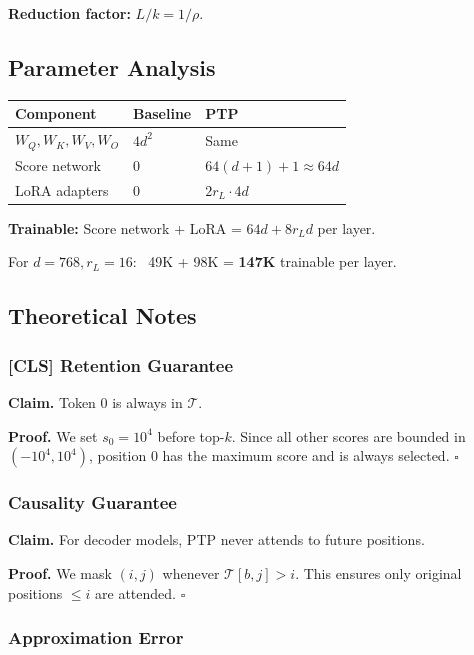 {\textbf{Reduction factor:} $L / k = 1 / \rho$.

\subsection{Parameter Analysis}

\begin{table}[H]
\centering
\small
\begin{tabular}{lll}
\toprule
\textbf{Component} & \textbf{Baseline} & \textbf{PTP} \\
\midrule
$W_Q, W_K, W_V, W_O$ & $4 d^2$ & Same \\
Score network & 0 & $64 (d + 1) + 1 \approx 64 d$ \\
LoRA adapters & 0 & $2 r_L \cdot 4 d$ \\
\bottomrule
\end{tabular}
\end{table}

\textbf{Trainable:} Score network + LoRA = $64 d + 8 r_L d$ per layer.

For $d = 768, r_L = 16$: ~49K + 98K = \textbf{147K} trainable per layer.

\subsection{Theoretical Notes}

\subsubsection{[CLS] Retention Guarantee}

\textbf{Claim.} Token 0 is always in $\mathcal{T}$.

\textbf{Proof.} We set $s_0 = 10^4$ before top-$k$. Since all other scores are 
bounded in $(-10^4, 10^4)$, position 0 has the maximum score and is always 
selected. $\square$

\subsubsection{Causality Guarantee}

\textbf{Claim.} For decoder models, PTP never attends to future positions.

\textbf{Proof.} We mask $(i, j)$ whenever $\mathcal{T}[b, j] > i$. This ensures 
only original positions $\leq i$ are attended. $\square$

\subsubsection{Approximation Error}

}
